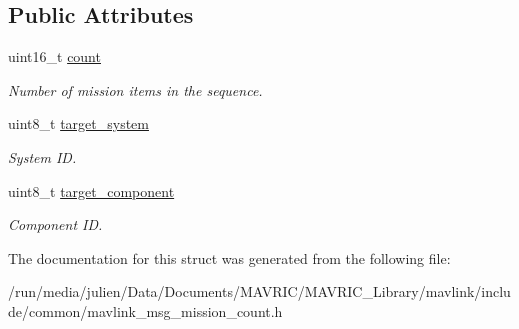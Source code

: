 \subsection*{Public Attributes}
\begin{DoxyCompactItemize}
\item 
\hypertarget{struct____mavlink__mission__count__t_ae0f07b1c9ffca95b6c76cde724eda5d9}{uint16\+\_\+t \hyperlink{struct____mavlink__mission__count__t_ae0f07b1c9ffca95b6c76cde724eda5d9}{count}}\label{struct____mavlink__mission__count__t_ae0f07b1c9ffca95b6c76cde724eda5d9}

\begin{DoxyCompactList}\small\item\em Number of mission items in the sequence. \end{DoxyCompactList}\item 
\hypertarget{struct____mavlink__mission__count__t_a9e211af96b9dd62f71c32fb3412dbfca}{uint8\+\_\+t \hyperlink{struct____mavlink__mission__count__t_a9e211af96b9dd62f71c32fb3412dbfca}{target\+\_\+system}}\label{struct____mavlink__mission__count__t_a9e211af96b9dd62f71c32fb3412dbfca}

\begin{DoxyCompactList}\small\item\em System I\+D. \end{DoxyCompactList}\item 
\hypertarget{struct____mavlink__mission__count__t_a21576207ae6595d5272a405fb8c198bf}{uint8\+\_\+t \hyperlink{struct____mavlink__mission__count__t_a21576207ae6595d5272a405fb8c198bf}{target\+\_\+component}}\label{struct____mavlink__mission__count__t_a21576207ae6595d5272a405fb8c198bf}

\begin{DoxyCompactList}\small\item\em Component I\+D. \end{DoxyCompactList}\end{DoxyCompactItemize}


The documentation for this struct was generated from the following file\+:\begin{DoxyCompactItemize}
\item 
/run/media/julien/\+Data/\+Documents/\+M\+A\+V\+R\+I\+C/\+M\+A\+V\+R\+I\+C\+\_\+\+Library/mavlink/include/common/mavlink\+\_\+msg\+\_\+mission\+\_\+count.\+h\end{DoxyCompactItemize}
